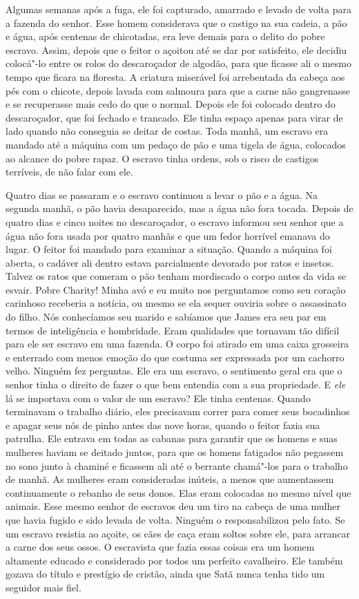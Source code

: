 Algumas semanas após a fuga, ele foi
capturado, amarrado e levado de volta para a fazenda do senhor. Esse
homem considerava que o castigo na sua cadeia, a pão e água, após
centenas de chicotadas, era leve demais para o delito do pobre escravo.
Assim, depois que o feitor o açoitou até se dar por satisfeito, ele
decidiu colocá"-lo entre os rolos do descaroçador de algodão, para que
ficasse ali o mesmo tempo que ficara na floresta. A criatura miserável
foi arrebentada da cabeça aos pés com o chicote, depois lavada com
salmoura para que a carne não gangrenasse e se recuperasse mais cedo do
que o normal. Depois ele foi colocado dentro do descaroçador, que foi
fechado e trancado. Ele tinha espaço apenas para virar de lado quando
não conseguia se deitar de costas. Toda manhã, um escravo era mandado
até a máquina com um pedaço de pão e uma tigela de água, colocados ao
alcance do pobre rapaz. O escravo tinha ordens, sob o risco de castigos
terríveis, de não falar com ele.

Quatro dias se passaram e o escravo
continuou a levar o pão e a água. Na segunda manhã, o pão havia
desaparecido, mas a água não fora tocada. Depois de quatro dias e cinco
noites no descaroçador, o escravo informou seu senhor que a água não
fora usada por quatro manhãs e que um fedor horrível emanava do lugar. O
feitor foi mandado para examinar a situação. Quando a máquina foi
aberta, o cadáver ali dentro estava parcialmente devorado por ratos e
insetos. Talvez os ratos que comeram o pão tenham mordiscado o corpo
antes da vida se esvair. Pobre Charity! Minha avó e eu muito nos
perguntamos como seu coração carinhoso receberia a notícia, ou mesmo se
ela sequer ouviria sobre o assassinato do filho. Nós conhecíamos seu
marido e sabíamos que James era seu par em termos de inteligência e
hombridade. Eram qualidades que tornavam tão difícil para ele ser
escravo em uma fazenda. O corpo foi atirado em uma caixa grosseira e
enterrado com menos emoção do que costuma ser expressada por um cachorro
velho. Ninguém fez perguntas. Ele era um escravo, o sentimento geral era
que o senhor tinha o direito de fazer o que bem entendia com a sua
propriedade. E \emph{ele} lá se importava com o valor de um escravo? Ele
tinha centenas. Quando terminavam o trabalho diário, eles precisavam
correr para comer seus bocadinhos e apagar seus nós de pinho antes das
nove horas, quando o feitor fazia sua patrulha. Ele entrava em todas as
cabanas para garantir que os homens e suas mulheres haviam se deitado
juntos, para que os homens fatigados não pegassem no sono junto à
chaminé e ficassem ali até o berrante chamá"-los para o trabalho de
manhã. As mulheres eram consideradas inúteis, a menos que aumentassem
continuamente o rebanho de seus donos. Elas eram colocadas no mesmo
nível que animais. Esse mesmo senhor de escravos deu um tiro na cabeça
de uma mulher que havia fugido e sido levada de volta. Ninguém o
responsabilizou pelo fato. Se um escravo resistia ao açoite, os cães de
caça eram soltos sobre ele, para arrancar a carne dos seus ossos. O
escravista que fazia essas coisas era um homem altamente educado e
considerado por todos um perfeito cavalheiro. Ele também gozava do
título e prestígio de cristão, ainda que Satã nunca tenha tido um
seguidor mais fiel.


